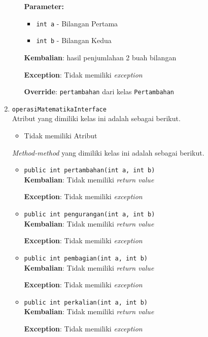 \documentclass{article}
\begin{document}
\begin{enumerate}
\begin{itemize}
\textbf{Parameter:}
\begin{itemize}
\item \texttt{int a} - 
Bilangan Pertama
\item \texttt{int b} - 
Bilangan Kedua
\end{itemize}
\textbf{Kembalian}: hasil penjumlahan 2 buah bilangan

\textbf{Exception}: Tidak memiliki \textit{exception}

\textbf{Override}: \texttt{pertambahan} dari kelas \texttt{Pertambahan}

\end{itemize}
\item \texttt{operasiMatematikaInterface}\\ 


Atribut yang dimiliki kelas ini adalah sebagai berikut.
\begin{itemize}
\item Tidak memiliki Atribut
\end{itemize}
\textit{Method-method} yang dimiliki kelas ini adalah sebagai berikut.
\begin{itemize}
\item \texttt{public int pertambahan(int a, int b)}\\ 


\textbf{Kembalian}: Tidak memiliki \textit{return value}

\textbf{Exception}: Tidak memiliki \textit{exception}

\item \texttt{public int pengurangan(int a, int b)}\\ 


\textbf{Kembalian}: Tidak memiliki \textit{return value}

\textbf{Exception}: Tidak memiliki \textit{exception}

\item \texttt{public int pembagian(int a, int b)}\\ 


\textbf{Kembalian}: Tidak memiliki \textit{return value}

\textbf{Exception}: Tidak memiliki \textit{exception}

\item \texttt{public int perkalian(int a, int b)}\\ 


\textbf{Kembalian}: Tidak memiliki \textit{return value}

\textbf{Exception}: Tidak memiliki \textit{exception}

\end{itemize}
\end{enumerate}
\end{document}
